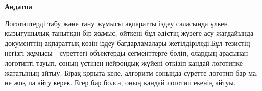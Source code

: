 \newpage
\pagestyle{plain}

{
\begin{center}
    \Large
    \textbf{Аңдатпа}
\end{center}
 Логотиптерді табу және тану жұмысы ақпаратты іздеу саласында үлкен қызығушылық танытқан бір жұмыс, өйткені бұл әдістің жүзеге асу жағдайында документтің ақпараттық көзін іздеу бағдарламалары жетілдіріледі.Бұл тезистің негізгі жұмысы - суреттегі объектерды сегменттерге бөліп, олардың арасынан логотипті тауып, соның үстінен нейрондық жүйені өткізіп қандай логотипке жататының айтыу. Бірақ қорыта келе, алгоритм соныңда суретте логотип бар ма, не жоқ па айту керек. Егер бар болса, оның қандай логотип екенің айтуы. 
}